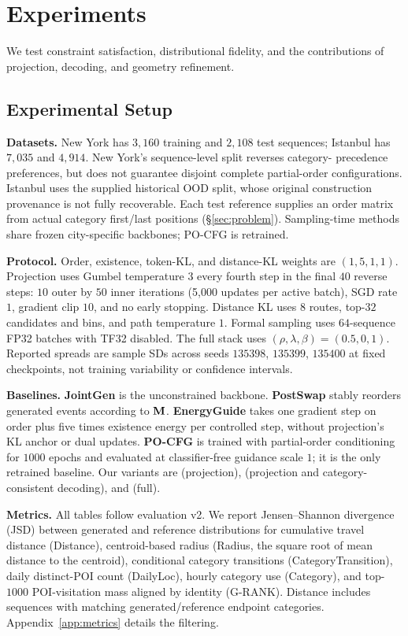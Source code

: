 \section{Experiments}
\label{sec:experiments}
We test constraint satisfaction, distributional fidelity, and the contributions
of projection, decoding, and geometry refinement.

\subsection{Experimental Setup}
\label{sec:exp:setup}
\noindent\textbf{Datasets.}
New York has $3{,}160$ training and $2{,}108$ test sequences; Istanbul has
$7{,}035$ and $4{,}914$. New York's sequence-level split reverses category-
precedence preferences, but does not guarantee disjoint complete partial-order
configurations. Istanbul uses the supplied historical OOD split, whose original
construction provenance is not fully recoverable. Each test reference supplies
an order matrix from actual category first/last positions (\S\ref{sec:problem}).
Sampling-time methods share frozen city-specific backbones; PO-CFG is retrained.

\noindent\textbf{Protocol.}
Order, existence, token-KL, and distance-KL weights are $(1,5,1,1)$.
Projection uses Gumbel temperature $3$ every fourth step in the final $40$
reverse steps: $10$ outer by $50$ inner iterations (5,000 updates per active
batch), SGD rate $1$, gradient clip $10$, and no early stopping. Distance KL
uses $8$ routes, top-$32$ candidates and bins, and path temperature $1$.
Formal sampling uses $64$-sequence FP32 batches with TF32 disabled. The full
stack uses $(\rho,\lambda,\beta)=(0.5,0,1)$. Reported spreads are sample SDs
across seeds $135398$, $135399$, $135400$ at fixed checkpoints, not training
variability or confidence intervals.

\noindent\textbf{Baselines.}
\textbf{JointGen} is the unconstrained backbone.
\textbf{PostSwap} stably reorders generated events according to $\mathbf{M}$.
\textbf{EnergyGuide} takes one gradient step on order plus five times existence
energy per controlled step, without projection's KL anchor or dual updates.
\textbf{PO-CFG} is trained with partial-order conditioning for $1000$ epochs and
evaluated at classifier-free guidance scale $1$; it is the only retrained
baseline. Our variants are \pcdgp (projection), \pcdgpd (projection and
category-consistent decoding), and \pcdg (full).

\noindent\textbf{Metrics.}
\label{sec:exp:metrics}
All tables follow evaluation v2. We report Jensen--Shannon divergence (JSD)
between generated and reference distributions for cumulative travel distance
(Distance), centroid-based radius (Radius, the square root of mean distance to
the centroid), conditional category transitions (CategoryTransition), daily
distinct-POI count (DailyLoc), hourly category use (Category), and top-$1000$
POI-visitation mass aligned by identity (G-RANK). Distance includes sequences
with matching generated/reference endpoint categories. Appendix~\ref{app:metrics}
details the filtering.

